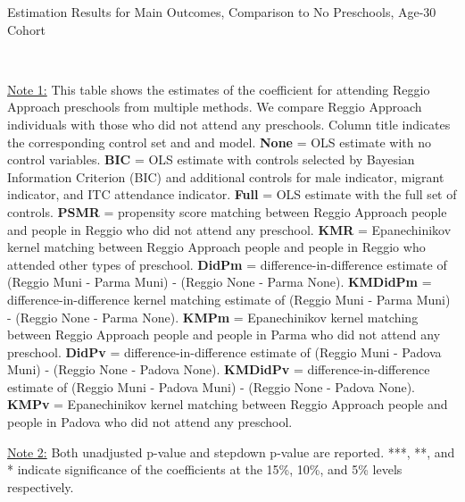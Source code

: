 \begin{table}[H] \caption{Estimation Results for Main Outcomes, Comparison to No Preschools, Age-30 Cohort} \label{ols-M-adult30-reg-nopres}
\scalebox{0.6}{}
\vspace{1ex} \\
\footnotesize\raggedright{\underline{Note 1:} This table shows the estimates of the coefficient for attending Reggio Approach preschools from multiple methods. We compare Reggio Approach individuals with those who did not attend any preschools. Column title indicates the corresponding control set and and model. \textbf{None} = OLS estimate with no control variables. \textbf{BIC} = OLS estimate with controls selected by Bayesian Information Criterion (BIC) and additional controls for male indicator, migrant indicator, and ITC attendance indicator. \textbf{Full} = OLS estimate with the full set of controls. \textbf{PSMR} =  propensity score matching between Reggio Approach people and people in Reggio who did not attend any preschool. \textbf{KMR} = Epanechinikov kernel matching between Reggio Approach people and people in Reggio who attended other types of preschool. \textbf{DidPm} = difference-in-difference estimate of (Reggio Muni - Parma Muni) - (Reggio None - Parma None). \textbf{KMDidPm} = difference-in-difference kernel matching estimate of (Reggio Muni - Parma Muni) - (Reggio None - Parma None). \textbf{KMPm} = Epanechinikov kernel matching between Reggio Approach people and people in Parma who did not attend any preschool. \textbf{DidPv} = difference-in-difference estimate of (Reggio Muni - Padova Muni) - (Reggio None - Padova None). \textbf{KMDidPv} = difference-in-difference estimate of (Reggio Muni - Padova Muni) - (Reggio None - Padova None). \textbf{KMPv} = Epanechinikov kernel matching between Reggio Approach people and people in Padova who did not attend any preschool.}

\footnotesize\raggedright{\underline{Note 2:} Both unadjusted p-value and stepdown p-value are reported. ***, **, and * indicate significance of the coefficients at the 15\%, 10\%, and 5\% levels respectively.}
\end{table}


